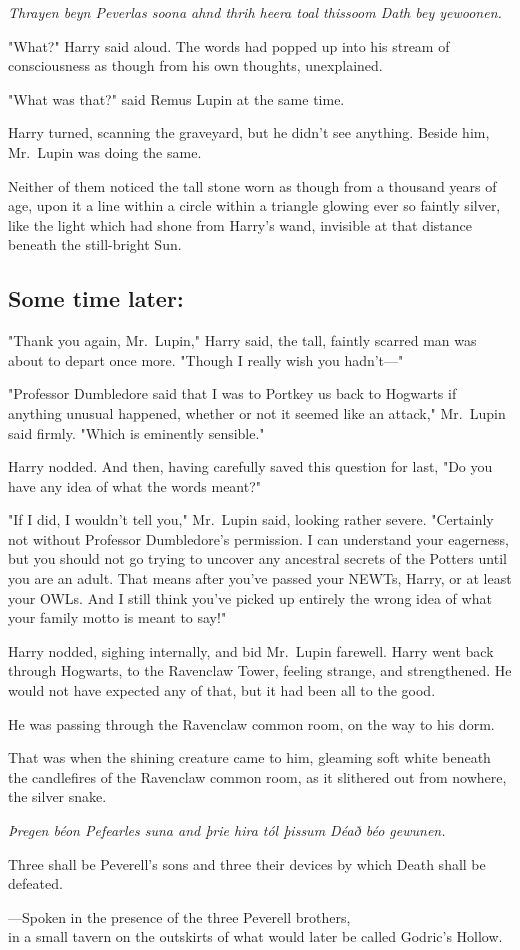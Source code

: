 \emph{Thrayen beyn Peverlas soona ahnd thrih heera toal thissoom Dath bey
yewoonen.}

"What?" Harry said aloud. The words had popped up into his stream of
consciousness as though from his own thoughts, unexplained.

"What was that?" said Remus Lupin at the same time.

Harry turned, scanning the graveyard, but he didn't see anything. Beside him,
Mr.~Lupin was doing the same.

Neither of them noticed the tall stone worn as though from a thousand years of
age, upon it a line within a circle within a triangle glowing ever so faintly
silver, like the light which had shone from Harry's wand, invisible at that
distance beneath the still-bright Sun.
\sbreak
\subsection{Some time later:}

"Thank you again, Mr.~Lupin," Harry said, the tall, faintly scarred man was
about to depart once more. "Though I really wish you hadn't\mbox{---}"

"Professor Dumbledore said that I was to Portkey us back to Hogwarts if
anything unusual happened, whether or not it seemed like an attack," Mr.~Lupin
said firmly. "Which is eminently sensible."

Harry nodded. And then, having carefully saved this question for last, "Do you
have any idea of what the words meant?"

"If I did, I wouldn't tell you," Mr.~Lupin said, looking rather severe.
"Certainly not without Professor Dumbledore's permission. I can understand your
eagerness, but you should not go trying to uncover any ancestral secrets of the
Potters until you are an adult. That means after you've passed your NEWTs,
Harry, or at least your OWLs. And I still think you've picked up entirely the
wrong idea of what your family motto is meant to say!"

Harry nodded, sighing internally, and bid Mr.~Lupin farewell.
\sbreak
Harry went back through Hogwarts, to the Ravenclaw Tower, feeling strange, and
strengthened. He would not have expected any of that, but it had been all to
the good.

He was passing through the Ravenclaw common room, on the way to his dorm.

That was when the shining creature came to him, gleaming soft white beneath the
candlefires of the Ravenclaw common room, as it slithered out from nowhere, the
silver snake.
\sbreak
\begin{center}
\emph{Þregen béon Pefearles suna and þrie hira
tól þissum Déað béo gewunen.}

Three shall be Peverell's sons and three their devices by which Death shall be
defeated.

---Spoken in the presence of the three Peverell brothers,\\
in a small tavern on the outskirts of what would later be called Godric's
Hollow.
\end{center}
